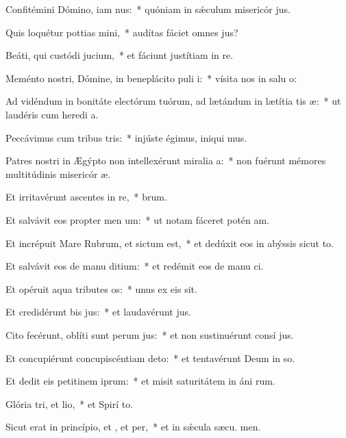 \item Confitémini Dómino, iam nus:~* quóniam in sǽculum misericór jus.
\item Quis loquétur pottias mini,~* audítas fáciet omnes  jus?
\item Beáti, qui custódi jucium,~* et fáciunt justítiam in  re.
\item Meménto nostri, Dómine, in beneplácito puli i:~* vísita nos in salu o:
\item Ad vidéndum in bonitáte electórum tuórum, ad lætándum in lætítia tis æ:~* ut laudéris cum heredi a.
\item Peccávimus cum tribus tris:~* injúste égimus, iniqui mus.
\item Patres nostri in Ægýpto non intellexérunt miralia a:~* non fuérunt mémores multitúdinis misericór æ.
\item Et irritavérunt ascentes in re,~*  brum.
\item Et salvávit eos propter men um:~* ut notam fáceret potén am.
\item Et incrépuit Mare Rubrum, et sictum est,~* et dedúxit eos in abýssis sicut  to.
\item Et salvávit eos de manu ditium:~* et redémit eos de manu ci.
\item Et opéruit aqua tributes os:~* unus ex eis  sit.
\item Et credidérunt bis jus:~* et laudavérunt  jus.
\item Cito fecérunt, oblíti sunt perum jus:~* et non sustinuérunt consí jus.
\item Et concupiérunt concupiscéntiam  deto:~* et tentavérunt Deum in so.
\item Et dedit eis petitinem iprum:~* et misit saturitátem in áni rum.
\item Glória tri, et lio,~* et Spirí to.
\item Sicut erat in princípio, et , et per,~* et in sǽcula sæcu. men.
